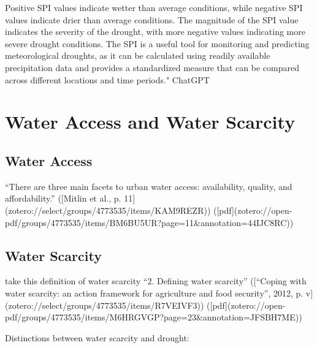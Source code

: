 {Positive SPI values indicate wetter than average conditions, while negative SPI values indicate drier than average conditions. The magnitude of the SPI value indicates the severity of the drought, with more negative values indicating more severe drought conditions. The SPI is a useful tool for monitoring and predicting meteorological droughts, as it can be calculated using readily available precipitation data and provides a standardized measure that can be compared across different locations and time periods." ChatGPT


\section{Water Access and Water Scarcity}

\subsection{Water Access}
“There are three main facets to urban water access: availability, quality, and affordability.” ([Mitlin et al., p. 11](zotero://select/groups/4773535/items/KAM9REZR)) ([pdf](zotero://open-pdf/groups/4773535/items/BM6BU5UR?page=11&annotation=44IJC8RC))


\subsection{Water Scarcity}

take this definition of water scarcity
“2. Defining water scarcity” ([“Coping with water scarcity: an action framework for agriculture and food security”, 2012, p. v](zotero://select/groups/4773535/items/R7VEIVF3)) ([pdf](zotero://open-pdf/groups/4773535/items/M6HRGVGP?page=23&annotation=JFSBH7ME))


Distinctions between water scarcity and drought:

}
